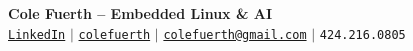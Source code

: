 \begin{center}
    \textbf{\Huge Cole Fuerth -- Embedded Linux \& AI} \\ \vspace{5pt}
    \hspace{1pt} \icon{\faLinkedin} \hspace{2pt} \href{https://www.linkedin.com/in/cole-fuerth-48344520a/}{\texttt{LinkedIn}} \hspace{1pt} $|$
    \hspace{1pt} \icon{\faGithub} \hspace{2pt} \href{https://github.com/colefuerth}{\texttt{colefuerth}} \hspace{1pt} $|$
    \hspace{1pt} \icon{\faEnvelope} \hspace{2pt} \href{mailto:colefuerth@gmail.com}{\texttt{colefuerth@gmail.com}} \hspace{1pt} $|$
    \hspace{1pt} \icon{\faPhone*} \hspace{2pt} \texttt{424.216.0805}
    \\ \vspace{-3pt}
  \end{center}